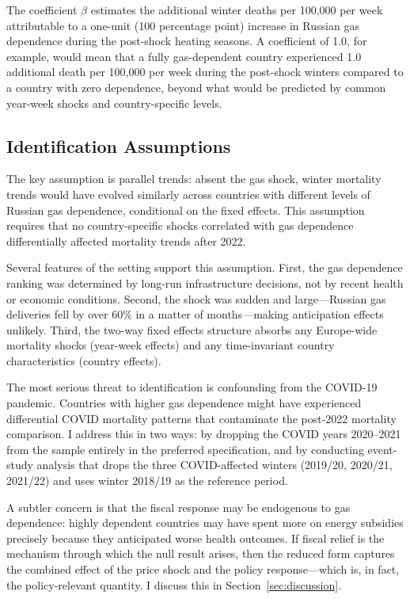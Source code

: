 \documentclass[12pt]{article}
\begin{document}
The coefficient $\beta$ estimates the additional winter deaths per 100,000 per week attributable to a one-unit (100 percentage point) increase in Russian gas dependence during the post-shock heating seasons. A coefficient of 1.0, for example, would mean that a fully gas-dependent country experienced 1.0 additional death per 100,000 per week during the post-shock winters compared to a country with zero dependence, beyond what would be predicted by common year-week shocks and country-specific levels.

\subsection{Identification Assumptions}

The key assumption is parallel trends: absent the gas shock, winter mortality trends would have evolved similarly across countries with different levels of Russian gas dependence, conditional on the fixed effects. This assumption requires that no country-specific shocks correlated with gas dependence differentially affected mortality trends after 2022.

Several features of the setting support this assumption. First, the gas dependence ranking was determined by long-run infrastructure decisions, not by recent health or economic conditions. Second, the shock was sudden and large---Russian gas deliveries fell by over 60\% in a matter of months---making anticipation effects unlikely. Third, the two-way fixed effects structure absorbs any Europe-wide mortality shocks (year-week effects) and any time-invariant country characteristics (country effects).

The most serious threat to identification is confounding from the COVID-19 pandemic. Countries with higher gas dependence might have experienced differential COVID mortality patterns that contaminate the post-2022 mortality comparison. I address this in two ways: by dropping the COVID years 2020--2021 from the sample entirely in the preferred specification, and by conducting event-study analysis that drops the three COVID-affected winters (2019/20, 2020/21, 2021/22) and uses winter 2018/19 as the reference period.

A subtler concern is that the fiscal response may be endogenous to gas dependence: highly dependent countries may have spent more on energy subsidies precisely because they anticipated worse health outcomes. If fiscal relief is the mechanism through which the null result arises, then the reduced form captures the combined effect of the price shock and the policy response---which is, in fact, the policy-relevant quantity. I discuss this in Section~\ref{sec:discussion}.
\end{document}
